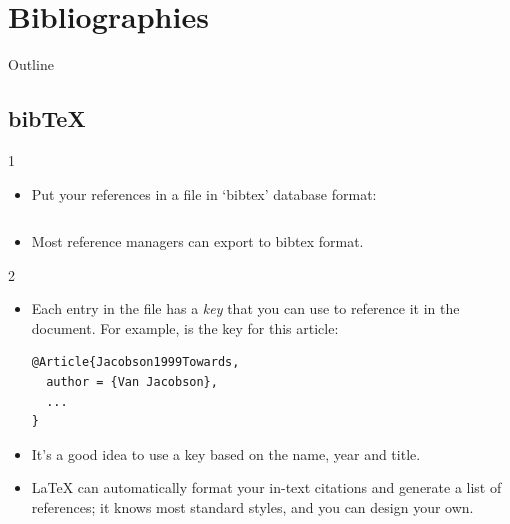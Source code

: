 \documentclass{beamer}
\begin{document}
\section{Bibliographies}

\begin{frame}{Outline}
\begin{multicols}{2}
\tableofcontents[currentsection]
\end{multicols}
\end{frame}

\subsection{bib\TeX}
\begin{frame}[fragile]{\insertsubsection{} 1}
\begin{itemize}
\item Put your references in a  file in `bibtex' database format:
\inputminted[fontsize=\scriptsize,frame=single]{latex}{bib-example.bib}
\item Most reference managers can export to bibtex format.
\end{itemize}
\end{frame}

\begin{frame}[fragile]{\insertsubsection{} 2}
\begin{itemize}
\item Each entry in the  file has a \emph{key} that you can use to
reference it in the document. For example,  is the key for this article:
\begin{verbatim}
@Article{Jacobson1999Towards,
  author = {Van Jacobson},
  ...
}
\end{verbatim}
\item It's a good idea to use a key based on the name, year and title.
\item \LaTeX{} can automatically format your in-text citations and generate a
list of references; it knows most standard styles, and you can design your own.
\end{itemize}
\end{frame}
\end{document}
